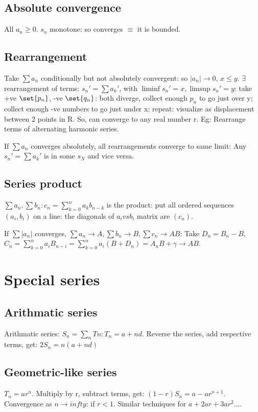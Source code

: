 \documentclass[oneside, article]{memoir}
\begin{document}
\subsection{Absolute convergence}
All $a_{n} \geq 0$. $s_{n}$ monotone: so converges $\equiv$ it is bounded.

\subsection{Rearrangement}
Take $\sum a_{n}$ conditionally but not absolutely convergent: so $|a_{n}| \to 0$, $x \leq y$. $\exists$ rearrangement of terms: $s_{n}' = \sum a_{k}'$, with $\liminf s_{n}' = x, \limsup s_{n}' = y$: take +ve $\set{p_{n}}$, -ve $\set{q_n}$: both diverge, collect enough $p_{n}$ to go just over y; collect enough -ve numbers to go just under x; repeat: visualize as displacement between 2 points in R. So, can converge to any real number r. Eg: Rearrange terms of alternating harmonic series.

If $\sum a_{n}$ converges absolutely, all rearrangements converge to same limit: Any $s_{n}' = \sum a_{k}'$ is in some $s_N$ and vice versa.

\subsection{Series product}
$\sum a_{n}, \sum b_{n}: c_{n} = \sum_{k=0}^{n}a_{k}b_{n-k}$ is the product: put all ordered sequences $(a_{i}, b_{i})$ on a line: the diagonals of $a_{i} vs b_{i}$ matrix are $(c_{n})$.

If $\sum |a_{n}|$ converges, $\sum a_{n} \to A, \sum b_{n} \to B, \sum c_{n} \to AB$: Take $D_n = B_n - B$, $C_{n} = \sum_{k=0}^{n}a_{i}B_{n-i} = \sum_{k=0}^{n}a_{i}(B + D_n) = A_{n}B + \gamma \to AB$.

\section{Special series}
\subsection{Arithmatic series}
Arithmatic series: $S_n = \sum_n Tn: T_n = a + nd$. Reverse the series, add respective terms, get: $2S_n = n(a+nd)$

\subsection{Geometric-like series}
$T_n = ar^{n}$. Multiply by r, subtract terms, get: $(1 - r)S_n = a - ar^{n+1}$. Convergence as $n \to infty$: if $r < 1$. Similar techniques for $a+2ar+3ar^{2} \dots$.
\end{document}
